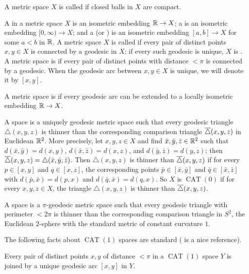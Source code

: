 \documentclass{amsart}
\DeclareMathOperator{\CAT}{CAT}
\begin{document}
A metric space $X$ is called  if closed balls in $X$ are compact.

A  in a metric space $X$ is an isometric embedding $\mathbb{R} \to X$; a  is an isometric embedding $[0,\infty) \to X$; and a  (or ) is an isometric embedding $[a,b] \to X$ for some $a < b$ in $\mathbb{R}$.
A metric space $X$ is called  if every pair of distinct points $x,y \in X$ is connected by a geodesic in $X$; if every such geodesic is unique, $X$ is .
A metric space is  if every pair of distinct points with distance $< \pi$ is connected by a geodesic.
When the geodesic arc between $x,y \in X$ is unique, we will denote it by $[x,y]$.

A metric space is  if every geodesic arc can be extended to a locally isometric embedding $\mathbb{R} \to X$.

A \defn{$\CAT(0)$} space is a uniquely geodesic metric space such that every geodesic triangle $\triangle (x,y,z)$ is thinner than the corresponding comparison triangle $\overline{\triangle} (x,y,z)$ in Euclidean $\mathbb{R}^2$.
More precisely, let $x,y,z \in X$ and find $\bar x, \bar y, \bar z \in \mathbb{R}^2$ such that $d(\bar x, \bar y) = d(x,y)$, $d(\bar x, \bar z) = d(x,z)$, and $d(\bar y, \bar z) = d(y,z)$; then $\overline{\triangle} (x,y,z) = \triangle (\bar x, \bar y, \bar z)$.
Then $\triangle (x,y,z)$ is thinner than $\overline{\triangle} (x,y,z)$ if for every $p \in [x,y]$ and $q \in [x,z]$, the corresponding points $\bar p \in [\bar x, \bar y]$ and $\bar q \in [\bar x, \bar z]$ with $d(\bar p, \bar x) = d(p,x)$ and $d(\bar q, \bar x) = d(q,x)$.
So $X$ is $\CAT(0)$ if for every $x,y,z \in X$, the triangle $\triangle (x,y,z)$ is thinner than $\overline{\triangle} (x,y,z)$.

A \defn{$\CAT(1)$} space is a $\pi$-geodesic metric space such that every geodesic triangle with perimeter $< 2\pi$ is thinner than the corresponding comparison triangle in $S^2$, the Euclidean $2$-sphere with the standard metric of constant curvature $1$.

The following facts about $\CAT(1)$ spaces are standard (\cite{bridson} is a nice reference).

\begin{lemma}			\label{unique geodesics}
Every pair of distinct points $x,y$ of distance $< \pi$ in a $\CAT(1)$ space $Y$ is joined by a unique geodesic arc $[x,y]$ in $Y$. \end{lemma}
\end{document}
